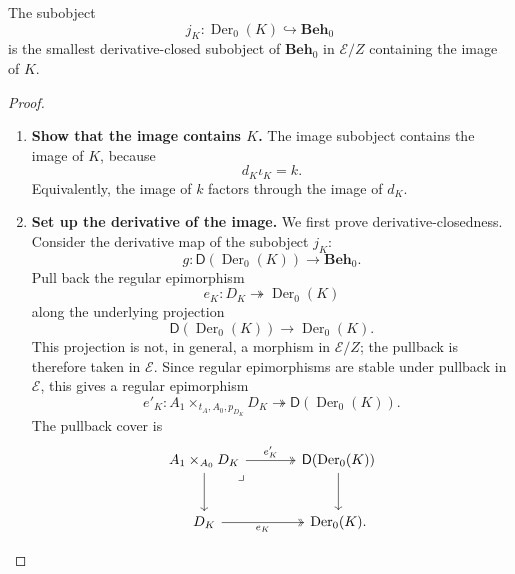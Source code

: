 \begin{theorem}
\label{thm:derivative-closure}
    The subobject
    \[
        j_K:\operatorname{Der}_0(K)\hookrightarrow\mathbf{Beh}_0
    \]
    is the smallest derivative-closed subobject of \(\mathbf{Beh}_0\) in
    \(\mathcal E/Z\) containing the image of \(K\).
\end{theorem}
\begin{proof}
    \leavevmode
    \begin{enumerate}
        \item \textbf{Show that the image contains \(K\).} The image subobject contains the image of \(K\), because
        \[
            d_K\iota_K=k.
        \]
        Equivalently, the image of \(k\) factors through the image of \(d_K\).

        \item \textbf{Set up the derivative of the image.} We first prove derivative-closedness. Consider the derivative map of the subobject \(j_K\):
        \[
            g:
            \mathsf D(\operatorname{Der}_0(K))\to\mathbf{Beh}_0.
        \]
        Pull back the regular epimorphism
        \[
            e_K:D_K\twoheadrightarrow \operatorname{Der}_0(K)
        \]
        along the underlying projection
        \[
            \mathsf D(\operatorname{Der}_0(K))\to\operatorname{Der}_0(K).
        \]
        This projection is not, in general, a morphism in \(\mathcal E/Z\); the pullback is therefore taken in \(\mathcal E\). Since regular epimorphisms are stable under pullback in \(\mathcal E\), this gives a regular epimorphism
        \[
            e'_K:
            A_1\times_{t_A,A_0,p_{D_K}}D_K
            \twoheadrightarrow
            \mathsf D(\operatorname{Der}_0(K)).
        \]
        The pullback cover is
        \[
            \begin{tikzcd}[column sep=large, row sep=large]
                    A_1\times_{A_0}D_K
                        \arrow[r, two heads, "e'_K"]
                        \arrow[d]
                        \arrow[dr, phantom, "\lrcorner", very near start]
                &
                    \mathsf D(\operatorname{Der}_0(K))
                        \arrow[d]
                \\
                    D_K
                        \arrow[r, two heads, "e_K"']
                &
                    \operatorname{Der}_0(K).
            \end{tikzcd}
        \]


\end{enumerate}
\end{proof}
